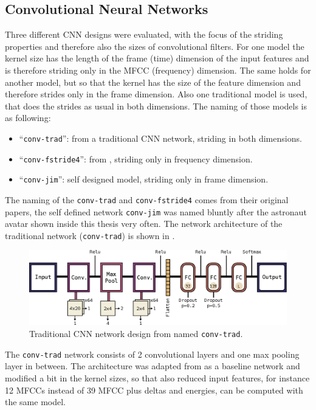 \subsection{Convolutional Neural Networks}\label{sec:nn_arch_cnn}
Three different CNN designs were evaluated, with the focus of the striding properties and therefore also the sizes of convolutional filters.
For one model the kernel size has the length of the frame (time) dimension of the input features and is therefore striding only in the MFCC (frequency) dimension.
The same holds for another model, but so that the kernel has the size of the feature dimension and therefore strides only in the frame dimension.
Also one traditional model is used, that does the strides as usual in both dimensions.
The naming of those models is as following:
\begin{itemize}
	\item \enquote{\texttt{conv-trad}}: from \cite{Sainath2015} a traditional CNN network, striding in both dimensions.
	\item \enquote{\texttt{conv-fstride4}}: from \cite{Sainath2015}, striding only in frequency dimension.
	\item \enquote{\texttt{conv-jim}}: self designed model, striding only in frame dimension.
\end{itemize}
The naming of the \texttt{conv-trad} and \texttt{conv-fstride4} comes from their original papers, the self defined network \texttt{conv-jim} was named bluntly after the astronaut avatar shown inside this thesis very often.
The network architecture of the traditional network (\texttt{conv-trad}) is shown in .
\begin{figure}[!ht]
  \centering
    \includegraphics[height=0.2\textwidth]{./4_nn/figs/nn_arch_cnn_trad.eps}
  \caption{Traditional CNN network design from \cite{Sainath2015} named \texttt{conv-trad}.}
  \label{fig:nn_arch_cnn_trad}
\end{figure}
\FloatBarrier
\noindent
The \texttt{conv-trad} network consists of 2 convolutional layers and one max pooling layer in between.
The architecture was adapted from \cite{Sainath2015} as a baseline network and modified a bit in the kernel sizes, so that also reduced input features, for instance 12 MFCCs instead of 39 MFCC plus deltas and energies, can be computed with the same model.
